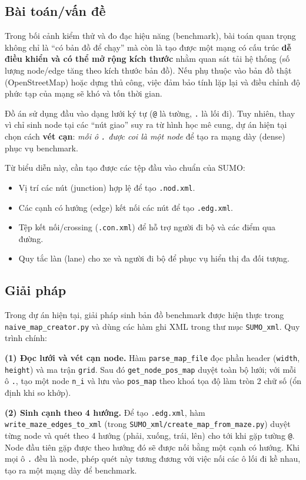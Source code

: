 \documentclass[../DoAn.tex]{subfiles}
\begin{document}
\subsection{Bài toán/vấn đề}
Trong bối cảnh kiểm thử và đo đạc hiệu năng (benchmark), bài toán quan trọng không chỉ là ``có bản đồ để chạy'' mà còn là tạo được một mạng có cấu trúc \textbf{dễ điều khiển và có thể mở rộng kích thước} nhằm quan sát tải hệ thống (số lượng node/edge tăng theo kích thước bản đồ). Nếu phụ thuộc vào bản đồ thật (OpenStreetMap) hoặc dựng thủ công, việc đảm bảo tính lặp lại và điều chỉnh độ phức tạp của mạng sẽ khó và tốn thời gian.

Đồ án sử dụng đầu vào dạng lưới ký tự (\texttt{@} là tường, \texttt{.} là lối đi). Tuy nhiên, thay vì chỉ sinh node tại các ``nút giao'' suy ra từ hình học mê cung, dự án hiện tại chọn cách \textbf{vét cạn}: \emph{mỗi ô \texttt{.} được coi là một node} để tạo ra mạng dày (dense) phục vụ benchmark.

Từ biểu diễn này, cần tạo được các tệp đầu vào chuẩn của SUMO:
\begin{itemize}[leftmargin=2em]
	\item Vị trí các nút (junction) hợp lệ để tạo \texttt{.nod.xml}.
	\item Các cạnh có hướng (edge) kết nối các nút để tạo \texttt{.edg.xml}.
	\item Tệp kết nối/crossing (\texttt{.con.xml}) để hỗ trợ người đi bộ và các điểm qua đường.
	\item Quy tắc làn (lane) cho xe và người đi bộ để phục vụ hiển thị đa đối tượng.
\end{itemize}

\subsection{Giải pháp}
Trong dự án hiện tại, giải pháp sinh bản đồ benchmark được hiện thực trong \texttt{naive\_map\_creator.py} và dùng các hàm ghi XML trong thư mục \texttt{SUMO\_xml}. Quy trình chính:

\textbf{(1) Đọc lưới và vét cạn node.} Hàm \texttt{parse\_map\_file} đọc phần header (\texttt{width}, \texttt{height}) và ma trận \texttt{grid}. Sau đó \texttt{get\_node\_pos\_map} duyệt toàn bộ lưới; với mỗi ô \texttt{.}, tạo một node \texttt{n\_i} và lưu vào \texttt{pos\_map} theo khoá tọa độ làm tròn 2 chữ số (ổn định khi so khớp).

\textbf{(2) Sinh cạnh theo 4 hướng.} Để tạo \texttt{.edg.xml}, hàm \texttt{write\_maze\_edges\_to\_xml} (trong \texttt{SUMO\_xml/create\_map\_from\_maze.py}) duyệt từng node và quét theo 4 hướng (phải, xuống, trái, lên) cho tới khi gặp tường \texttt{@}. Node đầu tiên gặp được theo hướng đó sẽ được nối bằng một cạnh có hướng. Khi mọi ô \texttt{.} đều là node, phép quét này tương đương với việc nối các ô lối đi kề nhau, tạo ra một mạng dày để benchmark.
\end{document}

